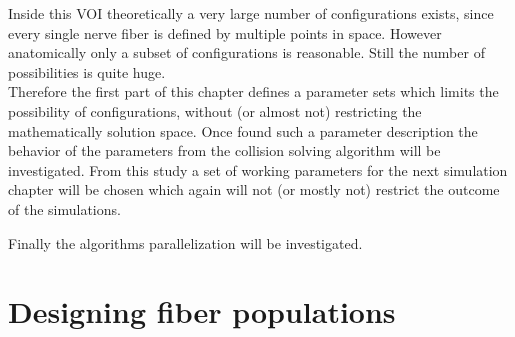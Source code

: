 Inside this \ac{VOI} theoretically a very large number of configurations exists, since every single nerve fiber is defined by multiple points in space.
However anatomically only a subset of configurations is reasonable.
Still the number of possibilities is quite huge.
\\
% 
Therefore the first part of this chapter defines a parameter sets which limits the possibility of configurations, without (or almost not) restricting the mathematically solution space.
Once found such a parameter description the behavior of the parameters from the collision solving algorithm will be investigated.
From this study a set of working parameters for the next simulation chapter will be chosen which again will not (or mostly not) restrict the outcome of the simulations.

Finally the algorithms parallelization will be investigated.
% 
% 
% 
\section{Designing fiber populations}
% 
